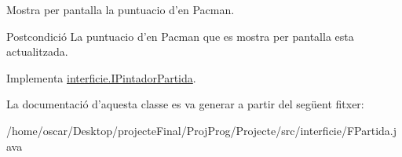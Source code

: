 Mostra per pantalla la puntuacio d'en Pacman. 

\begin{DoxyPostcond}{Postcondició}
La puntuacio d'en Pacman que es mostra per pantalla esta actualitzada. 
\end{DoxyPostcond}


Implementa \hyperlink{interfaceinterficie_1_1_i_pintador_partida_a65a58e702237296add7a42f92b89b311}{interficie.\+I\+Pintador\+Partida}.



La documentació d'aquesta classe es va generar a partir del següent fitxer\+:\begin{DoxyCompactItemize}
\item 
/home/oscar/\+Desktop/projecte\+Final/\+Proj\+Prog/\+Projecte/src/interficie/F\+Partida.\+java\end{DoxyCompactItemize}
